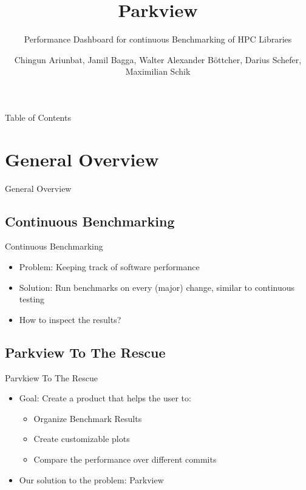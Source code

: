 \documentclass{beamer}
\title{\textcolor{nord10}{Parkview}}
\subtitle{\textcolor{nord9}{Performance Dashboard for continuous Benchmarking of HPC Libraries}}
\author{Chingun Ariunbat, Jamil Bagga, Walter Alexander B\"ottcher, Darius Schefer, Maximilian Schik}
\begin{document}
\maketitle

\begin{frame}{Table of Contents}
  \tableofcontents
\end{frame}

\section{General Overview}
\begin{frame}
  \begin{center}
    \Huge{General Overview}
  \end{center}
\end{frame}

\subsection{Continuous Benchmarking}
\begin{frame}{Continuous Benchmarking}
  \begin{itemize}
      \item Problem: Keeping track of software performance
      \item Solution: Run benchmarks on every (major) change, similar to continuous testing
      \item How to inspect the results?
  \end{itemize}
\end{frame}

\subsection{Parkview To The Rescue}
\begin{frame}{Parvkiew To The Rescue}
  \begin{itemize}
      \item Goal: Create a product that helps the user to:
        \begin{itemize}
          \item Organize Benchmark Results
          \item Create customizable plots
          \item Compare the performance over different commits
        \end{itemize}
      \item Our solution to the problem: Parkview
  \end{itemize}
\end{frame}
\end{document}
